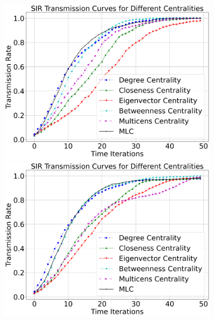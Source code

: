 \documentclass[10pt,letterpaper]{article}
\begin{document}
\begin{figure}[h!]
\begin{minipage}[b]{0.25\linewidth}
	\centering
	\includegraphics[width=\textwidth]{figs/fig23-npas2_bmal1-k2top2.png}
	\subcaption{}
\end{minipage}
\hspace{0.5cm}
\begin{minipage}[b]{0.25\linewidth}
	\centering
	\includegraphics[width=\textwidth]{figs/fig24-npas3_arnt-k1top2.png}
	\subcaption{}
\end{minipage}
\hspace{0.5cm}
\begin{minipage}[b]{0.25\linewidth}
	\centering

\end{minipage}
\end{figure}
\end{document}
